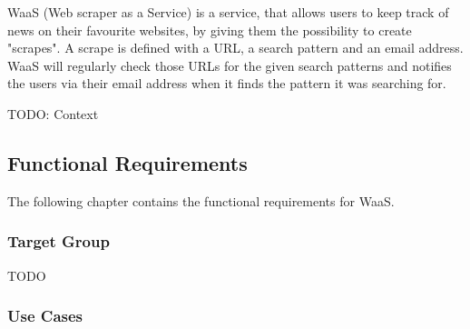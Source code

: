 \documentclass[titlepage, 12pt]{article}
\begin{document}
WaaS (Web scraper as a Service) is a service, that allows users to keep track of news on their favourite websites, by giving them the possibility to create "scrapes". A scrape is defined with a URL, a search pattern and an email address. WaaS will regularly check those URLs for the given search patterns and notifies the users via their email address when it finds the pattern it was searching for.

TODO: Context

\subsection{Functional Requirements}

The following chapter contains the functional requirements for WaaS.

\subsubsection{Target Group}

TODO

\subsubsection{{Use Cases}}
\end{document}
